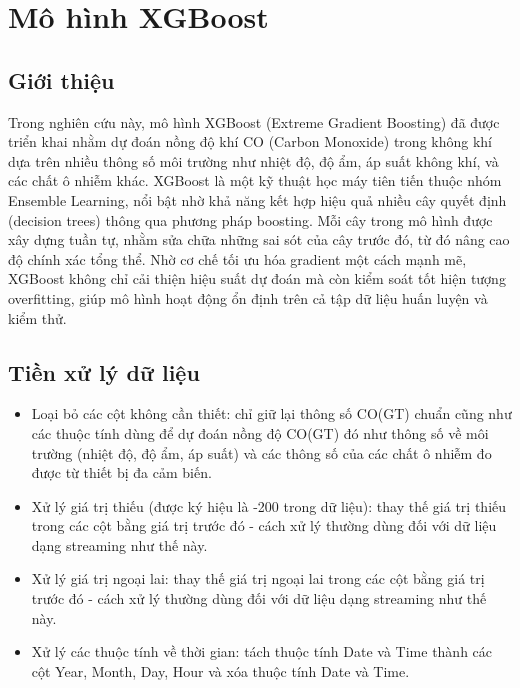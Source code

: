 \section{Mô hình XGBoost}

\subsection{Giới thiệu}
Trong nghiên cứu này, mô hình XGBoost (Extreme Gradient Boosting) đã được triển khai nhằm dự đoán nồng độ khí CO (Carbon Monoxide) trong không khí dựa trên nhiều thông số môi trường như nhiệt độ, độ ẩm, áp suất không khí, và các chất ô nhiễm khác. XGBoost là một kỹ thuật học máy tiên tiến thuộc nhóm Ensemble Learning, nổi bật nhờ khả năng kết hợp hiệu quả nhiều cây quyết định (decision trees) thông qua phương pháp boosting. Mỗi cây trong mô hình được xây dựng tuần tự, nhằm sửa chữa những sai sót của cây trước đó, từ đó nâng cao độ chính xác tổng thể. Nhờ cơ chế tối ưu hóa gradient một cách mạnh mẽ, XGBoost không chỉ cải thiện hiệu suất dự đoán mà còn kiểm soát tốt hiện tượng overfitting, giúp mô hình hoạt động ổn định trên cả tập dữ liệu huấn luyện và kiểm thử.

\subsection{Tiền xử lý dữ liệu}
\begin{itemize}
    \item Loại bỏ các cột không cần thiết: chỉ giữ lại thông số CO(GT) chuẩn cũng như các thuộc tính dùng để dự đoán nồng độ CO(GT) đó như thông số về môi trường (nhiệt độ, độ ẩm, áp suất) và các thông số của các chất ô nhiễm đo được từ thiết bị đa cảm biến. 
    \item Xử lý giá trị thiếu (được ký hiệu là -200 trong dữ liệu): thay thế giá trị thiếu trong các cột bằng giá trị trước đó - cách xử lý thường dùng đối với dữ liệu dạng streaming như thế này.
    \item Xử lý giá trị ngoại lai: thay thế giá trị ngoại lai trong các cột bằng giá trị trước đó - cách xử lý thường dùng đối với dữ liệu dạng streaming như thế này.
    \item Xử lý các thuộc tính về thời gian: tách thuộc tính Date và Time thành các cột Year, Month, Day, Hour và xóa thuộc tính Date và Time.
\end{itemize}

